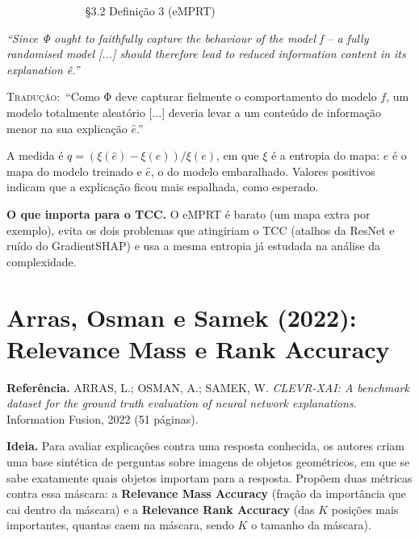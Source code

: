 \documentclass[11pt,a4paper]{article}
\newcommand{\pagechip}[1]{{\setlength{\fboxsep}{1.5pt}\colorbox{cAcc}{\textcolor{white}{\scriptsize\texttt{#1}}}}}
\newenvironment{origquote}{\par\itshape\small}{\par}
\newenvironment{tradquote}{\par\small\textsc{Tradução:}\ }{\par}
\newcommand{\explab}[1]{\par\smallskip{\small\color{cAcc}\textbf{\MakeUppercase{#1}}}\par}
\begin{document}
\begin{citacard}{\pagechip{Hedström p. 5} §3.2 Definição 3 (eMPRT)}
\begin{origquote}“Since Φ ought to faithfully capture the behaviour of the model f -- a fully randomised model [...] should therefore lead to reduced information content in its explanation ê.”\end{origquote}
\begin{tradquote}“Como Φ deve capturar fielmente o comportamento do modelo $f$, um modelo totalmente aleatório [...] deveria levar a um conteúdo de informação menor na sua explicação $\hat{e}$.”\end{tradquote}
\explab{Explicação}
A medida é $q = (\xi(\hat{e}) - \xi(e)) / \xi(e)$, em que $\xi$ é a entropia do mapa: $e$ é o mapa do modelo treinado e $\hat{e}$, o do modelo embaralhado. Valores positivos indicam que a explicação ficou mais espalhada, como esperado.
\end{citacard}

\textbf{O que importa para o TCC.} O eMPRT é barato (um mapa extra por exemplo), evita os dois problemas que atingiriam o TCC (atalhos da ResNet e ruído do GradientSHAP) e usa a mesma entropia já estudada na análise da complexidade.

\section{Arras, Osman e Samek (2022): Relevance Mass e Rank Accuracy}
\textbf{Referência.} ARRAS, L.; OSMAN, A.; SAMEK, W. \textit{CLEVR-XAI: A benchmark dataset for the ground truth evaluation of neural network explanations}. Information Fusion, 2022 (51 páginas).

\textbf{Ideia.} Para avaliar explicações contra uma resposta conhecida, os autores criam uma base sintética de perguntas sobre imagens de objetos geométricos, em que se sabe exatamente quais objetos importam para a resposta. Propõem duas métricas contra essa máscara: a \textbf{Relevance Mass Accuracy} (fração da importância que cai dentro da máscara) e a \textbf{Relevance Rank Accuracy} (das $K$ posições mais importantes, quantas caem na máscara, sendo $K$ o tamanho da máscara).
\end{document}
